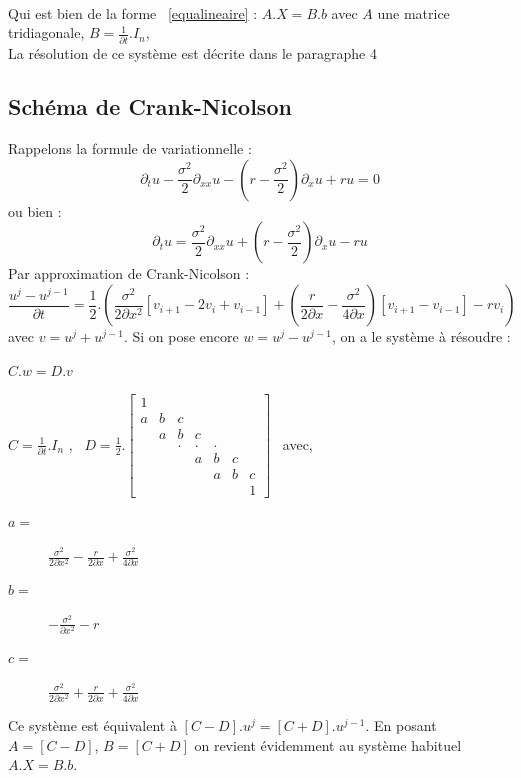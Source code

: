 \documentclass{book}
\begin{document}
\\ Qui est bien de la forme ~\eqref{equalineaire} : $A.X=B.b$ avec $A$ une matrice tridiagonale, $B=\frac{1}{\partial t}.I_n$, 
\\ La résolution de ce système est décrite dans le paragraphe 4
\subsection{Schéma de Crank-Nicolson}
\label{Crank}
Rappelons la formule de variationnelle :
\[\partial_{t}u-\frac{\sigma^{2}}{2}\partial_{xx}u-\left(r-\frac{\sigma^{2}}{2}\right)\partial_{x}u+ru=0\]
ou bien :
\[\partial_{t}u=\frac{\sigma^{2}}{2}\partial_{xx}u+\left(r-\frac{\sigma^{2}}{2}\right)\partial_{x}u-ru\]
Par approximation de Crank-Nicolson : 
\[\frac{u^j-u^{j-1}}{\partial t}=\frac{1}{2}.\left(\frac{\sigma^{2}}{2\partial x^{2}}\left[v_{i+1}-2v_{i}+v_{i-1}\right]+\left(\frac{r}{2\partial x}-\frac{\sigma^{2}}{4\partial x}\right)\left[v_{i+1}-v_{i-1}\right]-rv_{i}\right)\]
avec $v=u^{j}+u^{j-1}$. Si on pose encore $w=u^j-u^{j-1}$, on a le système à résoudre : 
\begin{center}
$C.w=D.v$ 
\end{center}
\begin{center}
$C=\frac{1}{\partial t}.I_n$ 
\hbox{, }
$D=\frac{1}{2}.\left[\begin{array}{ccccccc}
1\\
a & b & c\\
 & a & b & c\\
 &  & . & . & .\\
 &  &  & a & b & c\\
 &  &  &  & a & b & c\\
 &  &  &  &  &  & 1\end{array}\right]$ 
\hbox{\hspace{1cm} avec, }
\begin{minipage}{5cm}
\flushright
\begin{description}
\item[$a=$]{$\frac{\sigma^{2}}{2\partial x^{2}}-\frac{r}{2\partial x}+\frac{\sigma^{2}}{4\partial x}$}
\item[$b=$]{$-\frac{\sigma^{2}}{\partial x^{2}}-r$}
\item[$c=$]{$\frac{\sigma^{2}}{2\partial x^{2}}+\frac{r}{2\partial x}+\frac{\sigma^{2}}{4\partial x}$}
\end{description}
\end{minipage}
\end{center}
Ce système est équivalent à $[C-D].u^j=[C+D].u^{j-1}$. En posant $A=[C-D]$, $B=[C+D]$ on revient évidemment au système habituel $A.X=B.b$.
\end{document}
